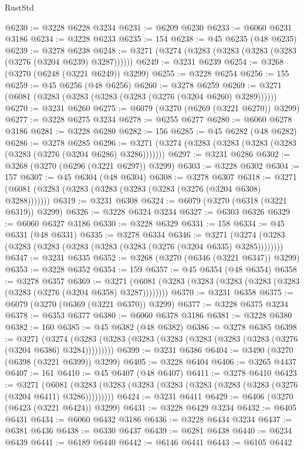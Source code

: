 \begin{lexlean}{RustStd}
\begin{coremodule}
@6230 := @3228 @6228 @3234
@6231 := @6209 @6230
@6233 := @6060 @6231 @3186
@6234 := @3228 @6233
@6235 := 154
@6238 := @45 @6235 (@48 @6235)
@6239 := @3278 @6238
@6248 := @3271 (@3274 (@3283 (@3283 (@3283 (@3283 (@3276 (@3204 @6239) @3287))))))
@6249 := @3231 @6239
@6254 := @3268 (@3270 (@6248 (@3221 @6249)) @3299)
@6255 := @3228 @6254
@6256 := 155
@6259 := @45 @6256 (@48 @6256)
@6260 := @3278 @6259
@6269 := @3271 (@6081 (@3283 (@3283 (@3283 (@3283 (@3276 (@3204 @6260) @3289))))))
@6270 := @3231 @6260
@6275 := @6079 (@3270 (@6269 (@3221 @6270)) @3299)
@6277 := @3228 @6275 @3234
@6278 := @6255 @6277
@6280 := @6060 @6278 @3186
@6281 := @3228 @6280
@6282 := 156
@6285 := @45 @6282 (@48 @6282)
@6286 := @3278 @6285
@6296 := @3271 (@3274 (@3283 (@3283 (@3283 (@3283 (@3283 (@3276 (@3204 @6286) @3286)))))))
@6297 := @3231 @6286
@6302 := @3268 (@3270 (@6296 (@3221 @6297)) @3299)
@6303 := @3228 @6302
@6304 := 157
@6307 := @45 @6304 (@48 @6304)
@6308 := @3278 @6307
@6318 := @3271 (@6081 (@3283 (@3283 (@3283 (@3283 (@3283 (@3276 (@3204 @6308) @3288)))))))
@6319 := @3231 @6308
@6324 := @6079 (@3270 (@6318 (@3221 @6319)) @3299)
@6326 := @3228 @6324 @3234
@6327 := @6303 @6326
@6329 := @6060 @6327 @3186
@6330 := @3228 @6329
@6331 := 158
@6334 := @45 @6331 (@48 @6331)
@6335 := @3278 @6334
@6346 := @3271 (@3274 (@3283 (@3283 (@3283 (@3283 (@3283 (@3283 (@3276 (@3204 @6335) @3285))))))))
@6347 := @3231 @6335
@6352 := @3268 (@3270 (@6346 (@3221 @6347)) @3299)
@6353 := @3228 @6352
@6354 := 159
@6357 := @45 @6354 (@48 @6354)
@6358 := @3278 @6357
@6369 := @3271 (@6081 (@3283 (@3283 (@3283 (@3283 (@3283 (@3283 (@3276 (@3204 @6358) @3287))))))))
@6370 := @3231 @6358
@6375 := @6079 (@3270 (@6369 (@3221 @6370)) @3299)
@6377 := @3228 @6375 @3234
@6378 := @6353 @6377
@6380 := @6060 @6378 @3186
@6381 := @3228 @6380
@6382 := 160
@6385 := @45 @6382 (@48 @6382)
@6386 := @3278 @6385
@6398 := @3271
    (@3274 (@3283 (@3283 (@3283 (@3283 (@3283 (@3283 (@3283 (@3276 (@3204 @6386) @3284)))))))))
@6399 := @3231 @6386
@6404 := @3490 (@3270 (@6398 (@3221 @6399)) @3299)
@6405 := @3228 @6404
@6406 := @3265 @4437
@6407 := 161
@6410 := @45 @6407 (@48 @6407)
@6411 := @3278 @6410
@6423 := @3271
    (@6081 (@3283 (@3283 (@3283 (@3283 (@3283 (@3283 (@3283 (@3276 (@3204 @6411) @3286)))))))))
@6424 := @3231 @6411
@6429 := @6406 (@3270 (@6423 (@3221 @6424)) @3299)
@6431 := @3228 @6429 @3234
@6432 := @6405 @6431
@6434 := @6060 @6432 @3186
@6436 := @3228 @6434 @3234
@6437 := @6381 @6436
@6438 := @6330 @6437
@6439 := @6281 @6438
@6440 := @6234 @6439
@6441 := @6189 @6440
@6442 := @6146 @6441
@6443 := @6105 @6442

\end{coremodule}
\end{lexlean}
